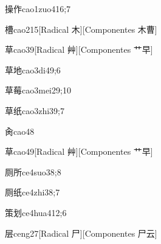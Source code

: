 \begin{verbete}{操作}{cao1zuo4}{16;7}
\end{verbete}

\begin{verbete}{槽}{cao2}{15}[Radical ⽊][Componentes ⽊曹]
\end{verbete}

\begin{verbete}{草}{cao3}{9}[Radical 艸][Componentes ⺾早]
\end{verbete}

\begin{verbete}{草地}{cao3di4}{9;6}
\end{verbete}

\begin{verbete}{草莓}{cao3mei2}{9;10}
\end{verbete}

\begin{verbete}{草纸}{cao3zhi3}{9;7}
\end{verbete}

\begin{verbete}{肏}{cao4}{8}
\end{verbete}

\begin{verbete}{草}{cao4}{9}[Radical 艸][Componentes ⺾早]
\end{verbete}

\begin{verbete}{厕所}{ce4suo3}{8;8}
\end{verbete}

\begin{verbete}{厕纸}{ce4zhi3}{8;7}
\end{verbete}

\begin{verbete}{策划}{ce4hua4}{12;6}
\end{verbete}

\begin{verbete}{层}{ceng2}{7}[Radical ⼫][Componentes ⼫云]
\end{verbete}

